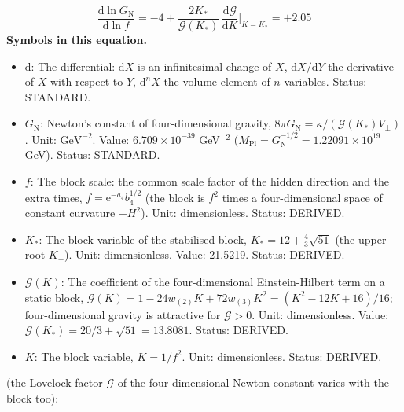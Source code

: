 \documentclass[
  10pt,
]{article}
\providecommand{\tightlist}{%
  \setlength{\itemsep}{0pt}\setlength{\parskip}{0pt}}
\begin{document}
\[ \frac{\mathrm{d}\ln G_{\mathrm{N}}}{\mathrm{d}\ln f} = -4 + \frac{2K_*}{\mathcal{G}(K_*)}\,\frac{\mathrm{d}\mathcal{G}}{\mathrm{d}K}\Big\vert_{K = K_*} = +2.05 \]
\textbf{Symbols in this equation.}

\begin{itemize}
\tightlist
\item
  \(\mathrm{d}\): The differential: \(\mathrm{d}X\) is an infinitesimal
  change of \(X\), \(\mathrm{d}X/\mathrm{d}Y\) the derivative of \(X\)
  with respect to \(Y\), \(\mathrm{d}^nX\) the volume element of \(n\)
  variables. Status: STANDARD.
\item
  \(G_{\mathrm{N}}\): Newton's constant of four-dimensional gravity,
  \(8\pi G_{\mathrm{N}} = \kappa/(\mathcal{G}(K_*)V_\perp)\). Unit:
  \(\mathrm{GeV}^{-2}\). Value: \(6.709\times10^{-39}\) GeV\(^{-2}\)
  (\(M_{\mathrm{Pl}} = G_{\mathrm{N}}^{-1/2} = 1.22091\times10^{19}\)
  GeV). Status: STANDARD.
\item
  \(f\): The block scale: the common scale factor of the hidden
  direction and the extra times, \(f = \mathrm{e}^{-a_4}b_4^{1/2}\) (the
  block is \(f^2\) times a four-dimensional space of constant curvature
  \(-H^2\)). Unit: dimensionless. Status: DERIVED.
\item
  \(K_*\): The block variable of the stabilised block,
  \(K_* = 12 + \frac43\sqrt{51}\) (the upper root \(K_+\)). Unit:
  dimensionless. Value: 21.5219. Status: DERIVED.
\item
  \(\mathcal{G}(K)\): The coefficient of the four-dimensional
  Einstein-Hilbert term on a static block,
  \(\mathcal{G}(K) = 1 - 24w_{(2)}K + 72w_{(3)}K^2 = (K^2 - 12K + 16)/16\);
  four-dimensional gravity is attractive for \(\mathcal{G} > 0\). Unit:
  dimensionless. Value:
  \(\mathcal{G}(K_*) = 20/3 + \sqrt{51} = 13.8081\). Status: DERIVED.
\item
  \(K\): The block variable, \(K = 1/f^2\). Unit: dimensionless. Status:
  DERIVED.
\end{itemize}

(the Lovelock factor \(\mathcal{G}\) of the four-dimensional Newton
constant varies with the block too):
\end{document}
